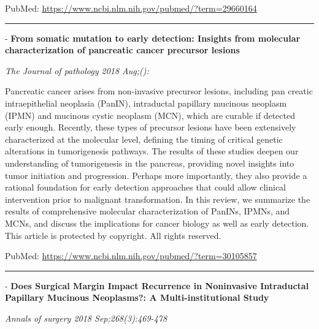 \documentclass[]{article}
\begin{document}
PubMed: \url{https://www.ncbi.nlm.nih.gov/pubmed/?term=29660164}

{}

{}

\begin{center}\rule{0.5\linewidth}{\linethickness}\end{center}

 - \textbf{From somatic mutation to early detection: Insights from
molecular characterization of pancreatic cancer precursor lesions}

\emph{The Journal of pathology 2018 Aug;():}

Pancreatic cancer arises from non-invasive precursor lesions, including
pan creatic intraepithelial neoplasia (PanIN), intraductal papillary
mucinous neoplasm (IPMN) and mucinous cystic neoplasm (MCN), which are
curable if detected early enough. Recently, these types of precursor
lesions have been extensively characterized at the molecular level,
defining the timing of critical genetic alterations in tumorigenesis
pathways. The results of these studies deepen our understanding of
tumorigenesis in the pancreas, providing novel insights into tumor
initiation and progression. Perhaps more importantly, they also provide
a rational foundation for early detection approaches that could allow
clinical intervention prior to malignant transformation. In this review,
we summarize the results of comprehensive molecular characterization of
PanINs, IPMNs, and MCNs, and discuss the implications for cancer biology
as well as early detection. This article is protected by copyright. All
rights reserved.

PubMed: \url{https://www.ncbi.nlm.nih.gov/pubmed/?term=30105857}

{}

{}

\begin{center}\rule{0.5\linewidth}{\linethickness}\end{center}

 - \textbf{Does Surgical Margin Impact Recurrence in Noninvasive
Intraductal Papillary Mucinous Neoplasms?: A Multi-institutional Study}

\emph{Annals of surgery 2018 Sep;268(3):469-478}
\end{document}
